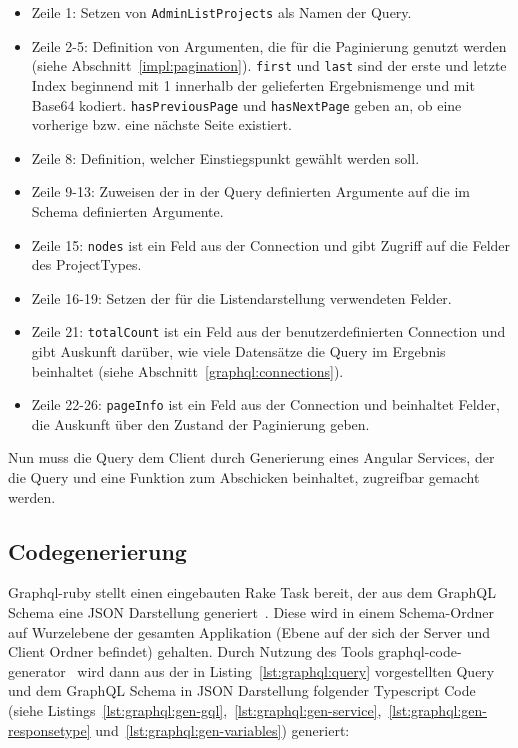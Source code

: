 \begin{itemize}
	\setlength\itemsep{-1em}
	\item Zeile 1: Setzen von \texttt{AdminListProjects} als Namen der Query.
	\item Zeile 2-5: Definition von Argumenten, die für die Paginierung genutzt werden (siehe Abschnitt~\ref{impl:pagination}). \texttt{first} und \texttt{last} sind der erste und letzte Index beginnend mit 1 innerhalb der gelieferten Ergebnismenge und mit Base64 kodiert. \texttt{hasPreviousPage} und \texttt{hasNextPage} geben an, ob eine vorherige bzw. eine nächste Seite existiert.
	\item Zeile 8: Definition, welcher Einstiegspunkt gewählt werden soll.
	\item Zeile 9-13: Zuweisen der in der Query definierten Argumente auf die im Schema definierten Argumente.
	\item Zeile 15: \texttt{nodes} ist ein Feld aus der Connection und gibt Zugriff auf die Felder des ProjectTypes.
	\item Zeile 16-19: Setzen der für die Listendarstellung verwendeten Felder.
	\item Zeile 21: \texttt{totalCount} ist ein Feld aus der benutzerdefinierten Connection und gibt Auskunft darüber, wie viele Datensätze die Query im Ergebnis beinhaltet (siehe Abschnitt~\ref{graphql:connections}).
	\item Zeile 22-26: \texttt{pageInfo} ist ein Feld aus der Connection und beinhaltet Felder, die Auskunft über den Zustand der Paginierung geben.
\end{itemize}

Nun muss die Query dem Client durch Generierung eines Angular Services, der die Query und eine Funktion zum Abschicken beinhaltet, zugreifbar gemacht werden.

\subsection{Codegenerierung}
\label{impl:graphql:generation}
Graphql-ruby stellt einen eingebauten Rake Task bereit, der aus dem GraphQL Schema eine JSON Darstellung generiert~\cite{graphql-rake-task}. Diese wird in einem Schema-Ordner auf Wurzelebene der gesamten Applikation (Ebene auf der sich der Server und Client Ordner befindet) gehalten.
Durch Nutzung des Tools graphql-code-generator~\cite{graphql-code-generator} wird dann aus der in Listing~\ref{lst:graphql:query} vorgestellten Query und dem GraphQL Schema in JSON Darstellung folgender Typescript Code (siehe Listings~\ref{lst:graphql:gen-gql},~\ref{lst:graphql:gen-service},~\ref{lst:graphql:gen-responsetype} und~\ref{lst:graphql:gen-variables}) generiert:

